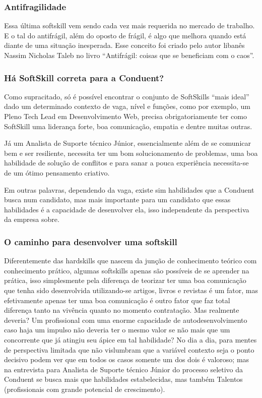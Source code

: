 \documentclass[12pt]{article}
\begin{document}
\subsubsection{Antifragilidade}

Essa última softskill vem sendo cada vez mais requerida no mercado de trabalho. E o tal do antifrágil, além do oposto de frágil, é algo que melhora quando está diante de uma situação inesperada. Esse conceito foi criado pelo autor libanês Nassim Nicholas Taleb no livro “Antifrágil: coisas que se beneficiam com o caos”.

\subsubsection{Há SoftSkill correta para a Conduent?} 

Como supracitado, só é possível encontrar o conjunto de SoftSkills “mais ideal” dado um determinado contexto de vaga, nível e funções, como por exemplo, um Pleno Tech Lead em Desenvolvimento Web, precisa obrigatoriamente ter como SoftSkill uma liderança forte, boa comunicação, empatia e dentre muitas outras. 

Já um Analista de Suporte técnico Júnior, essencialmente além de se comunicar bem e ser resiliente, necessita ter um bom solucionamento de problemas, uma boa habilidade de solução de conflitos e para sanar a pouca experiência necessita-se de um ótimo pensamento criativo. 

Em outras palavras, dependendo da vaga, existe sim habilidades que a Conduent busca num candidato, mas mais importante para um candidato que essas habilidades é a capacidade de desenvolver ela, isso independente da perspectiva da empresa sobre.

\subsubsection{O caminho para desenvolver uma softskill} 

Diferentemente das hardskills que nascem da junção de conhecimento teórico com conhecimento prático, algumas softskills apenas são possíveis de se aprender na prática, isso simplesmente pela diferença de teorizar ter uma boa comunicação que tenha sido desenvolvida utilizando-se artigos, livros e revistas é um fator, mas efetivamente apenas ter uma boa comunicação é outro fator que faz total diferença tanto na vivência quanto no momento contratação. 
Mas realmente deveria? Um profissional com uma enorme capacidade de autodesenvolvimento caso haja um impulso não deveria ter o mesmo valor se não mais que um concorrente que já atingiu seu ápice em tal habilidade? No dia a dia, para mentes de perspectiva limitada que não vislumbram que a variável contexto seja o ponto decisivo podem ver que em todos os casos somente um dos dois é valoroso; mas na entrevista para Analista de Suporte técnico Júnior do processo seletivo da Conduent se busca mais que habilidades estabelecidas, mas também Talentos (profissionais com grande potencial de crescimento).
\end{document}
